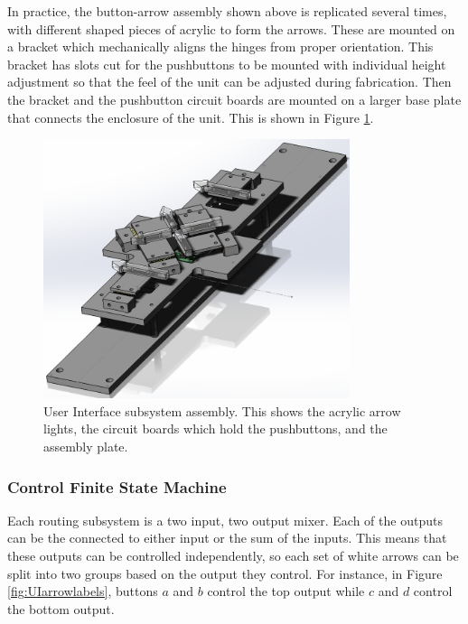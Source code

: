 \documentclass{article}
\begin{document}
	In practice, the button-arrow assembly shown above is replicated several times, with different shaped pieces of acrylic to form the arrows.  These are mounted on a bracket which mechanically aligns the hinges from proper orientation.  This bracket has slots cut for the pushbuttons to be mounted with individual height adjustment so that the feel of the unit can be adjusted during fabrication.  Then the bracket and the pushbutton circuit boards are mounted on a larger base plate that connects the enclosure of the unit.  This is shown in Figure \ref{fig:UIASM}.

	\begin{figure}
		\centering
		\includegraphics[width = 0.8\textwidth]{PR5Images/UIAsmCAD.png}
		\caption{User Interface subsystem assembly.  This shows the acrylic arrow lights, the circuit boards which hold the pushbuttons, and the assembly plate.}
		\label{fig:UIASM}
	\end{figure}

	\color{gray}

	\subsubsection{Control Finite State Machine}

	Each routing subsystem is a two input, two output mixer.  Each of the outputs can be the connected to either input or the sum of the inputs.  This means that these outputs can be controlled independently, so each set of white arrows can be split into two groups based on the output they control.  For instance, in Figure \ref{fig:UIarrowlabels}, buttons $a$ and $b$ control the top output while $c$ and $d$ control the bottom output.
\end{document}
